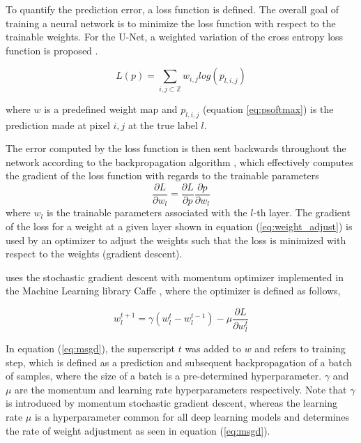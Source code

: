 \documentclass[../main/thesis.tex]{subfiles}
\begin{document}
To quantify the prediction error, a loss function is defined. The overall goal of training a neural network is to minimize the loss function with respect to the trainable weights. For the U-Net, a weighted variation of the cross entropy loss function is proposed \citep{Ronneberger2015}. 

\begin{equation}
    \label{eq:unet-loss}
    L(p) = \sum_{i,j \subset \mathbb{Z}}w_{i,j}log(p_{l,i,j})
\end{equation}

where $w$ is a predefined weight map and $p_{l,i,j}$ (equation \ref{eq:psoftmax}) is the prediction made at pixel $i,j$ at the true label $l$.

The error computed by the loss function is then sent backwards throughout the network according to the backpropagation algorithm \citep{Rumelhart1986}, which effectively computes the gradient of the loss function with regards to the trainable parameters 
\begin{equation}
    \label{eq:weight_adjust}
    \frac{\partial L}{\partial w_l} = \frac{\partial L}{\partial p}\frac{\partial p}{\partial w_l}
\end{equation}
where $w_l$ is the trainable parameters associated with the $l$-th layer. The gradient of the loss for a weight at a given layer shown in equation (\ref{eq:weight_adjust}) is used by an optimizer to adjust the weights such that the loss is minimized with respect to the weights (gradient descent).

\citet{Ronneberger2015} uses the stochastic gradient descent with momentum optimizer implemented in the Machine Learning library Caffe \citep{Jia2014}, where the optimizer is defined as follows,

\begin{equation}
    \label{eq:msgd}
    w_l^{t+1} = \gamma(w_l^t - w_l^{t-1}) - \mu\frac{\partial L}{\partial w_l^t}
\end{equation}

In equation (\ref{eq:msgd}), the superscript $t$ was added to $w$ and refers to training step, which is defined as a prediction and subsequent backpropagation of a batch of samples, where the size of a batch is a pre-determined hyperparameter. $\gamma$ and $\mu$ are the momentum and learning rate hyperparameters respectively. Note that $\gamma$ is introduced by momentum stochastic gradient descent, whereas the learning rate $\mu$ is a hyperparameter common for all deep learning models and determines the rate of weight adjustment as seen in equation (\ref{eq:msgd}).
\end{document}
